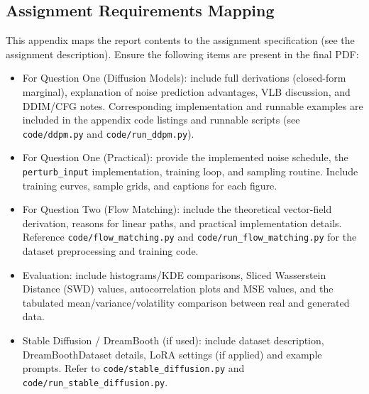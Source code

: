 \documentclass[a4paper,12pt]{article}
\begin{document}
\subsection{Assignment Requirements Mapping}
This appendix maps the report contents to the assignment specification (see the assignment description). Ensure the following items are present in the final PDF:
\begin{itemize}
    \item For Question One (Diffusion Models): include full derivations (closed-form marginal), explanation of noise prediction advantages, VLB discussion, and DDIM/CFG notes. Corresponding implementation and runnable examples are included in the appendix code listings and runnable scripts (see \texttt{code/ddpm.py} and \texttt{code/run\_ddpm.py}).
    \item For Question One (Practical): provide the implemented noise schedule, the \texttt{perturb\_input} implementation, training loop, and sampling routine. Include training curves, sample grids, and captions for each figure.
    \item For Question Two (Flow Matching): include the theoretical vector-field derivation, reasons for linear paths, and practical implementation details. Reference \texttt{code/flow\_matching.py} and \texttt{code/run\_flow\_matching.py} for the dataset preprocessing and training code.
    \item Evaluation: include histograms/KDE comparisons, Sliced Wasserstein Distance (SWD) values, autocorrelation plots and MSE values, and the tabulated mean/variance/volatility comparison between real and generated data.
    \item Stable Diffusion / DreamBooth (if used): include dataset description, DreamBoothDataset details, LoRA settings (if applied) and example prompts. Refer to \texttt{code/stable\_diffusion.py} and \texttt{code/run\_stable\_diffusion.py}.
\end{itemize}
\end{document}
